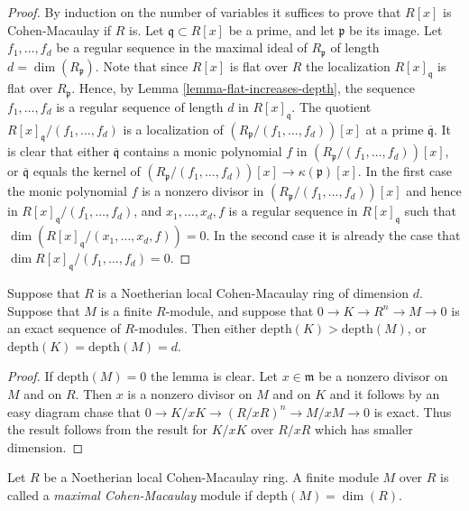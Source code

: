 \begin{proof}
By induction on the number of variables it suffices
to prove that $R[x]$ is Cohen-Macaulay if $R$ is.
Let $\mathfrak q \subset R[x]$ be a prime, and
let $\mathfrak p$ be its image.
Let $f_1, \ldots, f_d$ be a regular sequence
in the maximal ideal of $R_{\mathfrak p}$ of length
$d = \dim(R_{\mathfrak p})$. Note that since
$R[x]$ is flat over $R$ the localization
$R[x]_{\mathfrak q}$ is flat over $R_{\mathfrak p}$.
Hence, by Lemma \ref{lemma-flat-increases-depth}, the sequence
$f_1, \ldots, f_d$
is a regular sequence of length $d$ in $R[x]_{\mathfrak q}$.
The quotient $R[x]_{\mathfrak q}/(f_1, \ldots, f_d)$
is a localization of $(R_{\mathfrak p}/(f_1, \ldots, f_d))[x]$
at a prime $\overline{\mathfrak q}$. It is clear that
either $\overline{\mathfrak q}$ contains a monic
polynomial $f$ in $(R_{\mathfrak p}/(f_1, \ldots, f_d))[x]$,
or $\overline{\mathfrak q}$ equals the kernel of
$(R_{\mathfrak p}/(f_1, \ldots, f_d))[x] \to \kappa(\mathfrak p)[x]$.
In the first case the monic polynomial $f$ is a nonzero
divisor in $(R_{\mathfrak p}/(f_1, \ldots, f_d))[x]$ and hence
in $R[x]_{\mathfrak q}/(f_1, \ldots, f_d)$, and $x_1, \ldots, x_d, f$
is a regular sequence in $R[x]_{\mathfrak q}$
such that $\dim(R[x]_{\mathfrak q}/(x_1, \ldots, x_d, f)) = 0$.
In the second case it is already the case that
$\dim R[x]_{\mathfrak q}/(f_1, \ldots, f_d) = 0$.
\end{proof}


\begin{lemma}
\label{lemma-dimension-shift}
Suppose that $R$ is a Noetherian local Cohen-Macaulay ring of dimension $d$.
Suppose that $M$ is a finite $R$-module, and suppose that
$0 \to K \to R^{n} \to M \to 0$ is an exact sequence of $R$-modules.
Then either $\text{depth}(K) > \text{depth}(M)$, or
$\text{depth}(K) = \text{depth}(M) = d$.
\end{lemma}

\begin{proof}
If $\text{depth}(M) = 0$ the lemma is clear.
Let $x \in \mathfrak m$ be a nonzero divisor on $M$ and
on $R$. Then $x$ is a nonzero divisor on $M$ and on $K$
and it follows by an easy diagram chase that
$0 \to K/xK \to (R/xR)^n \to M/xM \to 0$ is exact.
Thus the result follows from the result for $K/xK$
over $R/xR$ which has smaller dimension.
\end{proof}

\begin{definition}
\label{definition-maximal-CM}
Let $R$ be a Noetherian local Cohen-Macaulay ring.
A finite module $M$ over $R$ is called a {\it maximal
Cohen-Macaulay} module if $\text{depth}(M) = \dim(R)$.
\end{definition}

